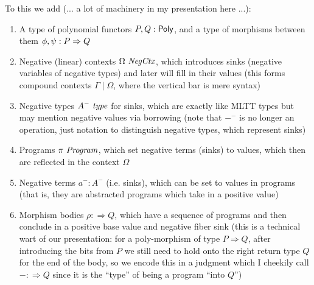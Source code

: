 \documentclass[final]{amsart}
\begin{document}
To this we add (... a lot of machinery in my presentation here ...):
\begin{enumerate}
  \item A type of polynomial functors $P, Q : \mathsf{Poly}$, and a type of morphisms between them $\phi, \psi : P \Rightarrow Q$
  \item Negative (linear) contexts $\Omega\ \mathit{NegCtx}$, which introduces sinks (negative variables of negative types) and later will fill in their values (this forms compound contexts $\Gamma \mid \Omega$, where the vertical bar is mere syntax)
  \item Negative types $A^{-}\, \operatorname{\mathit{type}}$ for sinks, which are exactly like MLTT types but may mention negative values via borrowing (note that ${-}^{-}$ is no longer an operation, just notation to distinguish negative types, which represent sinks)
  \item Programs $\pi\ \mathit{Program}$, which set negative terms (sinks) to values, which then are reflected in the context $\Omega$
  \item Negative terms $a^{-} : A^{-}$ (i.e. sinks), which can be set to values in programs (that is, they are abstracted programs which take in a positive value)
  \item Morphism bodies $\rho :\Rightarrow Q$, which have a sequence of programs and then conclude in a positive base value and negative fiber sink (this is a technical wart of our presentation: for a poly-morphism of type $P \Rightarrow Q$, after introducing the bits from $P$ we still need to hold onto the right return type $Q$ for the end of the body, so we encode this in a judgment which I cheekily call $- :\Rightarrow Q$ since it is the ``type'' of being a program ``into $Q$'')
\end{enumerate}
\end{document}
